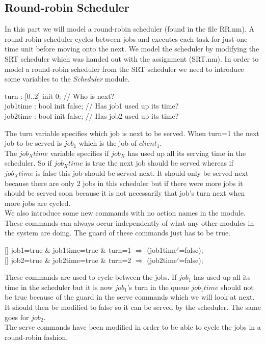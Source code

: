 \documentclass[12pt]{report}
\begin{document}
\subsection*{Round-robin Scheduler}
In this part we will model a round-robin scheduler (found in the file RR.nm). A round-robin scheduler cycles between jobs and executes each task for just one time unit before moving onto the next. We model the scheduler by modifying the SRT scheduler which was handed out with the assignment (SRT.nm). In order to model a round-robin scheduler from the SRT scheduler we need to introduce some variables to the \emph{Scheduler} module.
\begin{center}
turn : {[0..2]} init 0; // Who is next?\\
job1time : bool init false; // Has job1 used up its time?\\
job2time : bool init false; // Has job2 used up its time?\\
\end{center}
The turn variable specifies which job is next to be served. When turn=1 the next job to be served is $job_1$ which is the job of $client_1$.\\
The $job_Xtime$ variable specifies if $job_X$ has used up all its serving time in the scheduler. So if $job_Xtime$ is true the next job should be served whereas if $job_Xtime$ is false this job should be served next. It should only be served next because there are only 2 jobs in this scheduler but if there were more jobs it should be served soon because it is not necessarily that job's turn next when more jobs are cycled.\\
We also introduce some new commands with no action names in the module. These commands can always occur independently of what any other modules in the system are doing. The guard of these commands just has to be true.
\begin{center}
{[]} job1=true \& job1time=true \& turn=1 $\Rightarrow$ (job1time$'$=false);\\
{[]} job2=true \& job2time=true \& turn=2 $\Rightarrow$ (job2time$'$=false);
\end{center}
These commands are used to cycle between the jobs. If $job_1$ has used up all its time in the scheduler but it is now $job_1$'s turn in the queue $job_1time$ should not be true because of the guard in the serve commands which we will look at next. It should then be modified to false so it can be served by the scheduler. The same goes for $job_2$.\\
The serve commands have been modified in order to be able to cycle the jobs in a round-robin fashion.
\end{document}
